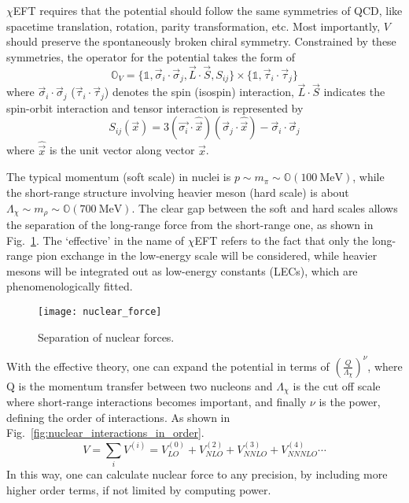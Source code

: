 $\chi$EFT requires that the potential should follow the same symmetries of QCD,
like spacetime translation, rotation, parity transformation, etc. Most importantly, $V$ should
preserve the spontaneously broken chiral symmetry. Constrained by these symmetries,
the operator for the potential takes the form of
\begin{equation}
    \mathds{O}_V = \{\mathds{1}, \vec{\sigma}_i \cdot \vec{\sigma}_j, \vec{L} \cdot \vec{S}, S_{ij}\} 
	\times \{\mathds{1}, \vec{\tau}_i \cdot \vec{\tau}_j\}
\end{equation}
where $\vec{\sigma}_i \cdot \vec{\sigma}_j$ ($\vec{\tau}_i \cdot \vec{\tau}_j$) 
denotes the spin (isospin) interaction, 
$\vec{L} \cdot \vec{S}$ indicates the spin-orbit interaction and tensor interaction
is represented by
\begin{equation}
    S_{ij}(\vec{x}) = 3(\vec{\sigma_i} \cdot \hat{\vec{x}})(\vec{\sigma}_j \cdot \hat{\vec{x}}) - \vec{\sigma}_i \cdot \vec{\sigma}_j
\end{equation}
where $\hat{\vec{x}}$ is the unit vector along vector $\vec{x}$.

The typical momentum (soft scale) in nuclei is $p \sim m_\pi \sim \mathds{O}(100\ \mathrm{MeV})$, 
while the short-range structure involving heavier meson (hard scale) is about 
$\Lambda_\chi \sim m_\rho \sim \mathds{O}(700 \ \mathrm{MeV})$. 
The clear gap between the soft and hard scales allows the separation of the 
long-range force from the short-range one, as shown in Fig.~\ref{fig:nuclear_potential}. 
The `effective' in the name of $\chi$EFT refers to the fact that only the 
long-range pion exchange in the low-energy scale will be considered, 
while heavier mesons will be integrated out as low-energy constants (LECs), 
which are phenomenologically fitted. 
\begin{figure}[!h]
    \centering
    \texttt{[image: nuclear\_force]}
    \caption{Separation of nuclear forces.}
    \label{fig:nuclear_potential}
\end{figure}

With the effective theory, one can expand the potential in terms of
$\left(\frac{Q}{\Lambda_\chi}\right)^\nu$, where Q is the momentum transfer
between two nucleons and $\Lambda_\chi$ is the cut off scale where short-range 
interactions becomes important, and
finally $\nu$ is the power, defining the order of interactions. As shown in
Fig.~\ref{fig:nuclear_interactions_in_order}.
\begin{equation}
    V = \sum_i V^{(i)} = V^{(0)}_{LO} + V^{(2)}_{NLO} + V^{(3)}_{NNLO} + V^{(4)}_{NNNLO} \cdots
\end{equation}
In this way, one can calculate nuclear force to any precision, by including
more higher order terms, if not limited by computing power.

